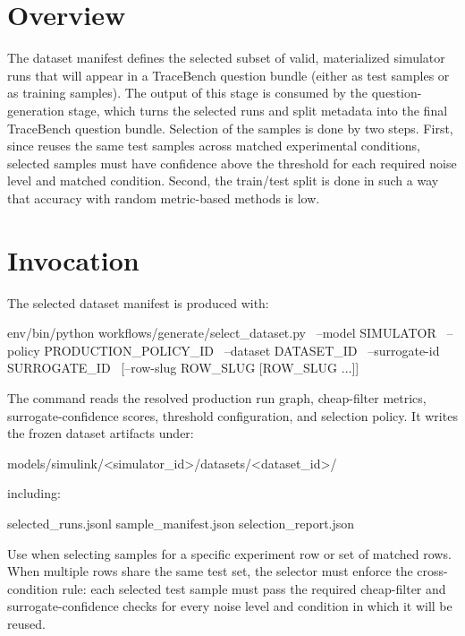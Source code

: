 \documentclass[11pt]{article}
\begin{document}
\label{docstart:dataset_manifest_schema}

\section*{Overview}
The dataset manifest defines the selected subset of valid, materialized simulator runs that will appear in a TraceBench question bundle (either as test samples or as training samples).
The output of this stage is consumed by the question-generation stage, which turns the selected runs and split metadata into the final TraceBench question bundle.
Selection of the samples is done by two steps.
First, since \name{} reuses the same test samples across matched experimental conditions, selected samples must have confidence above the threshold for each required noise level and matched condition.
Second, the train/test split is done in such a way that accuracy with random metric-based methods is low.

\section*{Invocation}

The selected dataset manifest is produced with:

\begin{DocCode}
env/bin/python workflows/generate/select_dataset.py \
  --model SIMULATOR \
  --policy PRODUCTION_POLICY_ID \
  --dataset DATASET_ID \
  --surrogate-id SURROGATE_ID \
  [--row-slug ROW_SLUG [ROW_SLUG ...]]
\end{DocCode}

The command reads the resolved production run graph, cheap-filter metrics, surrogate-confidence scores, threshold configuration, and selection policy.
It writes the frozen dataset artifacts under:

\begin{DocCode}
models/simulink/<simulator_id>/datasets/<dataset_id>/
\end{DocCode}

including:

\begin{DocCode}
selected_runs.jsonl
sample_manifest.json
selection_report.json
\end{DocCode}

Use  when selecting samples for a specific experiment row or set of matched rows.
When multiple rows share the same test set, the selector must enforce the cross-condition rule: each selected test sample must pass the required cheap-filter and surrogate-confidence checks for every noise level and condition in which it will be reused.
\end{document}
